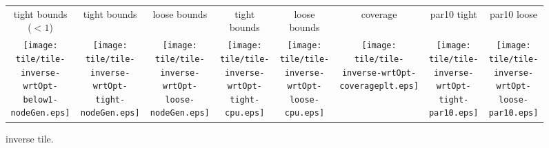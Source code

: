 \documentclass[a4paper,landscape]{article}
\begin{document}
\begin{figure}[t]
	\centering
		\begin{tabular}{c c c c c c c c}
	    tight bounds ($<1$) & tight bounds & loose bounds & tight bounds & loose bounds & coverage & par10 tight & par10 loose\\
	   \begin{minipage}{\cpufigureplotwidth}
      \texttt{[image: tile/tile-inverse-wrtOpt-below1-nodeGen.eps]}
        \end{minipage}&
        \begin{minipage}{\cpufigureplotwidth}
        \texttt{[image: tile/tile-inverse-wrtOpt-tight-nodeGen.eps]}
        \end{minipage}&
        \begin{minipage}{\cpufigureplotwidth}
      \texttt{[image: tile/tile-inverse-wrtOpt-loose-nodeGen.eps]}
      \end{minipage}&
        \begin{minipage}{\cpufigureplotwidth}
        \texttt{[image: tile/tile-inverse-wrtOpt-tight-cpu.eps]}
        \end{minipage}&
        \begin{minipage}{\cpufigureplotwidth}
        \texttt{[image: tile/tile-inverse-wrtOpt-loose-cpu.eps]}
        \end{minipage}&
        \begin{minipage}{\cpufigureplotwidth}
        \texttt{[image: tile/tile-inverse-wrtOpt-coverageplt.eps]}
        \end{minipage}&
        \begin{minipage}{\cpufigureplotwidth}
        \texttt{[image: tile/tile-inverse-wrtOpt-tight-par10.eps]}
        \end{minipage}&
        \begin{minipage}{\cpufigureplotwidth}
        \texttt{[image: tile/tile-inverse-wrtOpt-loose-par10.eps]}
        \end{minipage}
	\end{tabular}
\caption{inverse tile.}
\label{fig:tile-inverse}
\end{figure}
\end{document}
